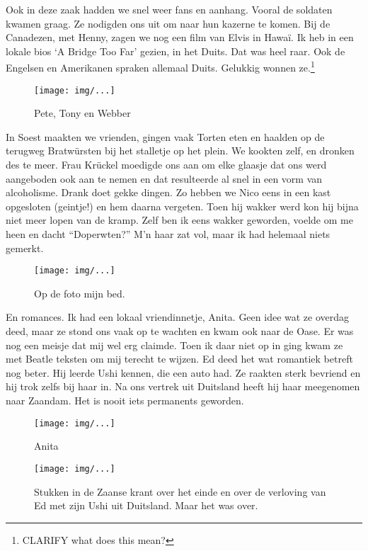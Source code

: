 \documentclass[10pt,twoside,openright]{memoir}
\begin{document}
Ook in deze zaak hadden we snel weer fans en aanhang. Vooral de soldaten kwamen graag. Ze nodigden ons uit om naar hun kazerne te komen. Bij de Canadezen, met Henny, zagen we nog een film van Elvis in Hawaï. Ik heb in een lokale bios ‘A Bridge Too Far’ gezien, in het Duits. Dat was heel raar. Ook de Engelsen en Amerikanen spraken allemaal Duits. Gelukkig wonnen ze.\footnote{CLARIFY what does this mean?}

\begin{figure}[t]
\texttt{[image: img/...]}
\caption{Pete, Tony en Webber}
\end{figure}

In Soest maakten we vrienden, gingen vaak Torten eten en haalden op de terugweg Bratwürsten bij het stalletje op het plein. We kookten zelf, en dronken des te meer. Frau Krückel moedigde ons aan om elke glaasje dat ons werd aangeboden ook aan te nemen en dat resulteerde al snel in een vorm van alcoholisme. Drank doet gekke dingen. Zo hebben we Nico eens in een kast opgesloten (geintje!) en hem daarna vergeten. Toen hij wakker werd kon hij bijna niet meer lopen van de kramp. Zelf ben ik eens wakker geworden, voelde om me heen en dacht ``Doperwten?'' M’n haar zat vol, maar ik had helemaal niets gemerkt. 

\begin{figure}[t]
\texttt{[image: img/...]}
\caption{Op de foto mijn bed.}
\end{figure}

En romances. Ik had een lokaal vriendinnetje, Anita. Geen idee wat ze overdag deed, maar ze stond ons vaak op te wachten en kwam ook naar de Oase. Er was nog een meisje dat mij wel erg claimde. Toen ik daar niet op in ging kwam ze met Beatle teksten om mij terecht te wijzen. Ed deed het wat romantiek betreft nog beter. Hij leerde Ushi kennen, die een auto had. Ze raakten sterk bevriend en hij trok zelfs bij haar in. Na ons vertrek uit Duitsland heeft hij haar meegenomen naar Zaandam. Het is nooit iets permanents geworden.

\begin{figure}[t]
\texttt{[image: img/...]}
\caption{Anita}
\end{figure}

\begin{figure}[t]
\texttt{[image: img/...]}
\caption{Stukken in de Zaanse krant over het einde en over de verloving van Ed met zijn Ushi uit Duitsland. Maar het was over.}
\end{figure}
\end{document}
